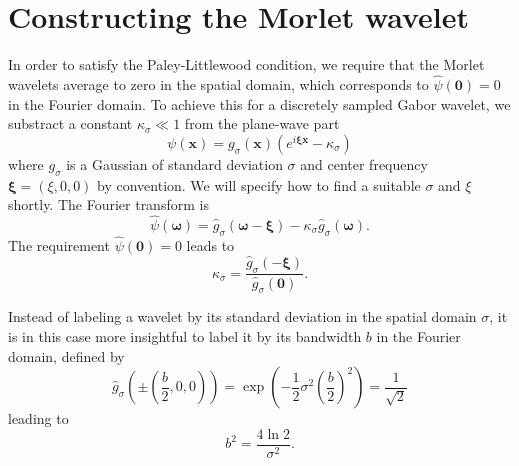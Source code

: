 \documentclass[twocolumn, openany, twoside, article]{memoir}
\begin{document}
\chapter{Constructing the Morlet wavelet}
In order to satisfy the Paley-Littlewood condition, we require that the Morlet wavelets average to zero in the spatial domain,
which corresponds to $\hat{\psi}(\bm{0}) = 0$ in the Fourier domain. To achieve this for a discretely sampled Gabor wavelet, we substract
a constant $\kappa_{\sigma} \ll 1$ from the plane-wave part
\begin{equation}
  \psi(\bm{x}) = g_{\sigma}(\bm{x})(e^{i \bm{\xi} \bm{x}} - \kappa_{\sigma})
\end{equation}
where $g_{\sigma}$ is a Gaussian of standard deviation $\sigma$ and center frequency $\bm{\xi} = (\xi, 0, 0)$ by convention.
We will specify how to find a suitable $\sigma$ and $\xi$ shortly.
The Fourier transform is
\begin{equation}
  \hat{\psi}(\bm{\omega}) = \hat{g}_{\sigma}(\bm{\omega} - \bm{\xi}) - \kappa_{\sigma}\hat{g}_{\sigma}(\bm{\omega}).
\end{equation}
The requirement $\hat{\psi}(\bm{0}) = 0$ leads to
\begin{equation}
  \kappa_{\sigma} = \frac{\hat{g}_{\sigma}(-\bm{\xi})}{\hat{g}_{\sigma}(\bm{0})}.
\end{equation}

Instead of labeling a wavelet by its standard deviation in the spatial domain $\sigma$, it is in this case
more insightful to label it by its bandwidth $b$ in the Fourier domain, defined by
\begin{equation}
  \hat{g}_{\sigma}\left(\pm \left(\frac{b}{2}, 0, 0 \right) \right) = \exp \left( -\frac{1}{2}\sigma^2 \left(\frac{b}{2}\right)^2 \right) = \frac{1}{\sqrt{2}}
\end{equation}
leading to
\begin{equation}
  b^2 = \frac{4 \ln 2}{\sigma^2}.
\end{equation}
\end{document}
